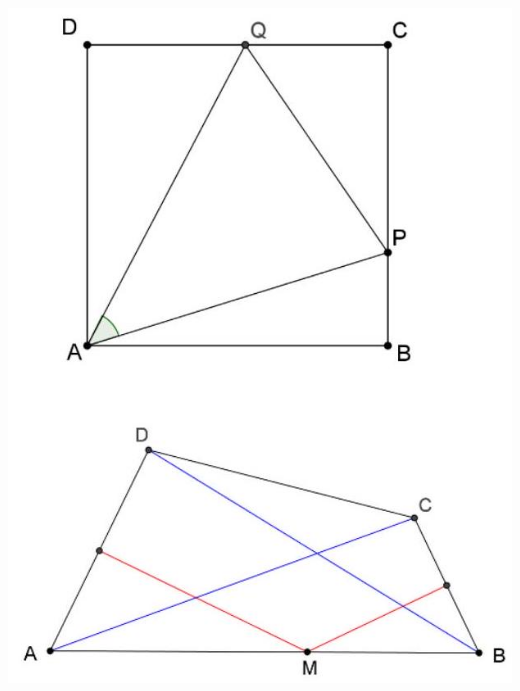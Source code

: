 \documentclass[10pt]{article}
\begin{document}
\begin{enumerate}
\includegraphics[max width=\textwidth, center]{2024_11_21_a3b3d3b4a87def3715fbg-1(2)}
\end{enumerate}
\end{document}
